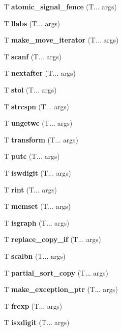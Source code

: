 \begin{DoxyCompactItemize}
\mbox{\label{atomic_signal_fence}} 
T \textbf{ atomic\+\_\+signal\+\_\+fence} (T... args)
\item 
\mbox{\label{abs}} 
T \textbf{ llabs} (T... args)
\item 
\mbox{\label{make_move_iterator}} 
T \textbf{ make\+\_\+move\+\_\+iterator} (T... args)
\item 
\mbox{\label{fscanf}} 
T \textbf{ scanf} (T... args)
\item 
\mbox{\label{nextafter}} 
T \textbf{ nextafter} (T... args)
\item 
\mbox{\label{stol}} 
T \textbf{ stol} (T... args)
\item 
\mbox{\label{strcspn}} 
T \textbf{ strcspn} (T... args)
\item 
\mbox{\label{ungetwc}} 
T \textbf{ ungetwc} (T... args)
\item 
\mbox{\label{transform}} 
T \textbf{ transform} (T... args)
\item 
\mbox{\label{fputc}} 
T \textbf{ putc} (T... args)
\item 
\mbox{\label{iswdigit}} 
T \textbf{ iswdigit} (T... args)
\item 
\mbox{\label{rint}} 
T \textbf{ rint} (T... args)
\item 
\mbox{\label{memset}} 
T \textbf{ memset} (T... args)
\item 
\mbox{\label{isgraph}} 
T \textbf{ isgraph} (T... args)
\item 
\mbox{\label{replace_copy}} 
T \textbf{ replace\+\_\+copy\+\_\+if} (T... args)
\item 
\mbox{\label{scalbn}} 
T \textbf{ scalbn} (T... args)
\item 
\mbox{\label{partial_sort_copy}} 
T \textbf{ partial\+\_\+sort\+\_\+copy} (T... args)
\item 
\mbox{\label{make_exception_ptr}} 
T \textbf{ make\+\_\+exception\+\_\+ptr} (T... args)
\item 
\mbox{\label{frexp}} 
T \textbf{ frexp} (T... args)
\item 
\mbox{\label{isxdigit}} 
T \textbf{ isxdigit} (T... args)

\end{DoxyCompactItemize}

